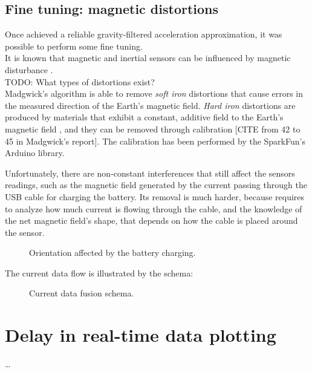 \subsection{Fine tuning: magnetic distortions}
Once achieved a reliable gravity-filtered acceleration approximation, it was possible to perform some fine tuning.\\
It is known that magnetic and inertial sensors can be influenced by magnetic disturbance \cite{Fan17}.\\
TODO: What types of distortions exist?\\
Madgwick's algorithm is able to remove \textit{soft iron} distortions \cite[11-12]{Mad10} that cause errors in the measured direction of the Earth's magnetic field. \textit{Hard iron} distortions are produced by materials that exhibit a constant, additive field to the Earth's magnetic field \cite{CompensatingIron}, and they can be removed through calibration \cite{CompensatingIron, Geb06, Kok12} [CITE from 42 to 45 in Madgwick's report]. The calibration has been performed by the SparkFun's Arduino library.
\bigbreak

Unfortunately, there are non-constant interferences that still affect the sensors readings, such as the magnetic field generated by the current passing through the USB cable for charging the battery.
Its removal is much harder, because requires to analyze how much current is flowing through the cable, and the knowledge of the net magnetic field's shape, that depends on how the cable is placed around the sensor.

\begin{center}
	\begin{figure}[ht!]
		\caption{Orientation affected by the battery charging.}
	\end{figure}
\end{center}

The current data flow is illustrated by the schema:

\begin{center}
	\begin{figure}[ht!]
		\caption{Current data fusion schema.}
	\end{figure}
\end{center}

\section{Delay in real-time data plotting}
\dots
